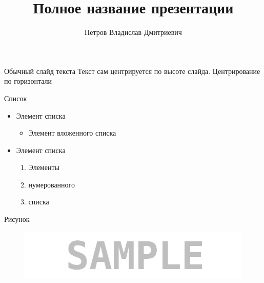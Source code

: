 \documentclass[11pt]{beamer}
\author[Петров В.Д.]{Петров Владислав Дмитриевич}
\title[Краткое название]{Полное название презентации}
\date{\the\year}
\begin{document}
\begin{frame}
\titlepage
\end{frame}


\begin{frame}{Обычный слайд текста}
Текст сам центрируется по высоте слайда. Центрирование по горизонтали 
\end{frame}


\begin{frame}{Список}
\begin{itemize}
	\item Элемент списка
	\begin{itemize}
		\item Элемент вложенного списка
	\end{itemize}
	\item Элемент списка
	\begin{enumerate}
		\item Элементы
		\item нумерованного
		\item списка
	\end{enumerate}
\end{itemize}
\end{frame}


\begin{frame}{Рисунок}
\begin{figure}[H]
	\includegraphics[scale=0.4]{pics/sample}
	\label{fig:sample}
\end{figure}
\end{frame}
\end{document}

